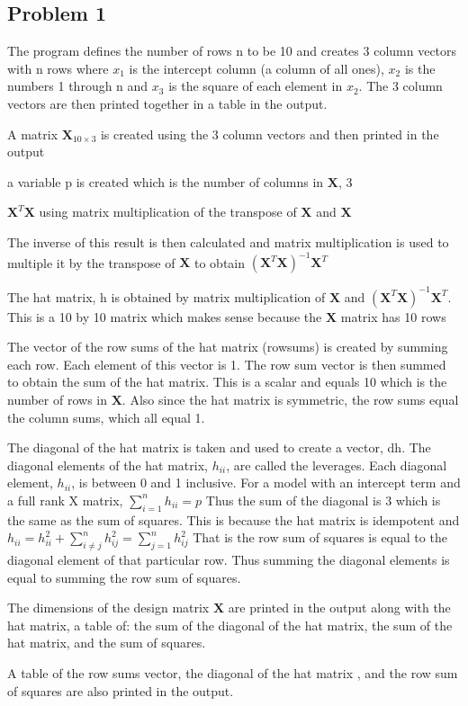 \documentclass{article}
\newcommand{\x}{\boldsymbol{X}}
\begin{document}
\begin{flushleft}

\section*{Problem 1}
The program defines the number of rows n to be 10 and creates 3 column vectors with n rows where $x_1$ is the intercept column (a column of all ones), $x_2$ is the numbers 1 through n and $x_3$ is the square of each element in $x_2$. The 3 column vectors are then printed together in a table in the output.\medbreak

A matrix $\x_{10\times 3}$ is created using the 3 column vectors and then printed in the output\medbreak

a variable p is created which is the number of columns in $\x$, 3\medbreak

$\x^T\x$ using matrix multiplication of the transpose of $\x$ and $\x$\medbreak

The inverse of this result is then calculated and matrix multiplication is used to multiple it by the transpose of $\x$ to obtain $(\x^T\x)^{-1}\x^T$\medbreak

The hat matrix, h is obtained by matrix multiplication of $\x$ and $(\x^T\x)^{-1}\x^T$. This is a 10 by 10 matrix which makes sense because the $\x$ matrix has 10 rows\medbreak

The vector of the row sums of the hat matrix (rowsums) is created by summing each row. Each element of this vector is 1. The row sum vector is then summed to obtain the sum of the hat matrix. This is a scalar and equals 10 which is the number of rows in $\x$. Also since the hat matrix is symmetric, the row sums equal the column sums, which all equal 1.\medbreak

The diagonal of the hat matrix is taken and used to create a vector, dh. The diagonal elements of the hat matrix, $h_{ii}$, are called the leverages. Each diagonal element, $h_{ii}$, is between 0 and 1 inclusive. For a model with an intercept term and a full rank X matrix, $\sum_{i=1}^{n}h_{ii}=p$ Thus the sum of the diagonal is 3 which is the same as the sum of squares. This is because the hat matrix is idempotent and $h_{ii}=h_{ii}^2+\sum_{i\neq j}^{n} h^2_{ij}=\sum_{j=1}^{n} h^2_{ij}$ That is the row sum of squares is equal to the diagonal element of that particular row. Thus summing the diagonal elements is equal to summing the row sum of squares. \medbreak

The dimensions of the design matrix $\x$ are printed in the output along with the hat matrix, a table of: the sum of the diagonal of the hat matrix, the sum of the hat matrix, and the sum of squares.\medbreak

A table of the row sums vector, the diagonal of the hat matrix , and the row sum of squares are also printed in the output.\medbreak



\end{flushleft}
\end{document}
